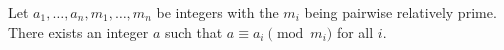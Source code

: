 Let $a_1, \ldots, a_n, m_1, \ldots, m_n$ be integers with the $m_i$ being pairwise relatively prime. There exists an integer $a$ such that $a \equiv a_i \pmod{m_i}$ for all $i$.
